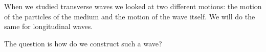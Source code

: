 \label{m38782*id292159}When we studied transverse waves we looked at two different motions: the motion of the particles of the medium and the motion of the wave itself. We will do the same for longitudinal waves.\par 
      \label{m38782*id292164}The question is how do we construct such a wave?\par 

